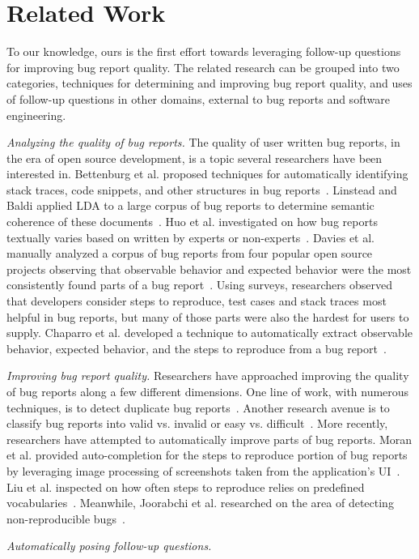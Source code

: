 \section{Related Work}
To our knowledge, ours is the first effort towards leveraging follow-up questions for
improving bug report quality. The related research can be grouped into two categories, techniques
for determining and improving bug report quality, and uses of follow-up questions in other domains,
external to bug reports and software engineering.

\noindent
{\em Analyzing the quality of bug reports.} The quality of user written bug reports,
in the era of open source development, is a topic several researchers have been interested
in. Bettenburg et al. proposed techniques for automatically identifying stack traces, code
snippets, and other structures in bug reports~\cite{bettenburg08extracting}. Linstead and Baldi
applied LDA to a large corpus of bug reports to determine semantic coherence of these
documents~\cite{linstead09mining}. Huo et al. investigated on how bug reports textually varies based on written by experts or non-experts~\cite{Huo2014AnES}. Davies et al. manually analyzed a corpus of bug reports
from four popular open source projects observing
that observable behavior and expected behavior were the most consistently found parts
of a bug report~\cite{davies14whats}. Using surveys, researchers observed that developers
consider steps to reproduce, test cases and stack traces most helpful in bug reports, but
many of those parts were also the hardest for users to supply. Chaparro et al. developed a
technique to automatically extract observable behavior, expected behavior, and the steps to
reproduce from a bug report~\cite{chaparro17detecting}.

\noindent
{\em Improving bug report quality.} Researchers have approached improving the quality of
bug reports along a few different dimensions. One line of work, with numerous techniques,
is to detect duplicate bug reports~\cite{chaparro19reformulating}. Another research avenue
is to classify bug reports into valid vs. invalid or easy vs. difficult~\cite{fan20chaff,hooimeijer07modeling}.
More recently, researchers have attempted to automatically improve parts of bug reports. Moran et al. provided
auto-completion for the steps to reproduce portion of bug reports by leveraging image processing
of screenshots taken from the application's UI~\cite{moran15autocompleting}. Liu et al. inspected on how often steps to reproduce relies on predefined vocabularies~\cite{liu2020automated}. Meanwhile, Joorabchi et al. researched on the area of detecting non-reproducible bugs~\cite{erfani2014works}. 

\noindent
{\em Automatically posing follow-up questions.} 
